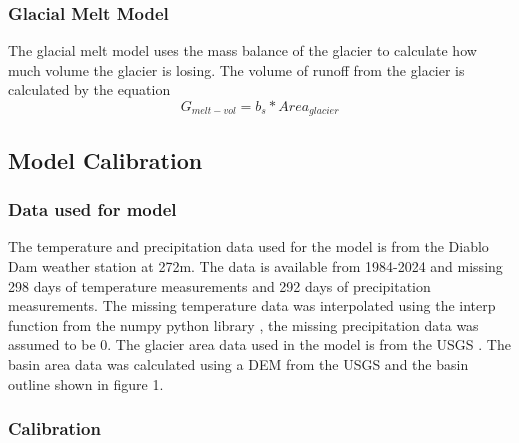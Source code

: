 \documentclass{article}
\begin{document}
\subsubsection{Glacial Melt Model}
The glacial melt model uses the mass balance of the glacier to calculate how much volume the glacier is losing. The volume of runoff from the 
glacier is calculated by the equation
\begin{equation}G_{melt-vol}=b_s*{Area}_{glacier}\end{equation}
\subsection{Model Calibration}
\subsubsection{Data used for model}
The temperature and precipitation data used for the model is from the Diablo Dam weather station at 272m. The data is available from 1984-2024 
and missing 298 days of temperature measurements and 292 days of precipitation measurements. The missing temperature data was interpolated 
using the interp function from the numpy python library \cite{ref7}, the missing precipitation data was assumed to be 0. The glacier area data used in 
the model is from the USGS \cite{ref8}. The basin area data was calculated using a DEM from the USGS and the basin outline shown in figure 1.

\subsubsection{Calibration}
\end{document}
